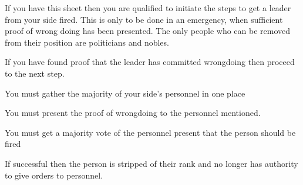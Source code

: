 \documentclass[green]{guildcamp3}
\begin{document}
	
	\name{\gYouAreFired{}}
		
	If you have this sheet then you are qualified to initiate the steps to get a leader from your side fired. This is only to be done in an emergency, when sufficient proof of wrong doing has been presented. The only people who can be removed from their position are politicians and nobles.	
	
	
	\begin{enum}[Directions]
		\item If you have found proof that the leader has committed wrongdoing then proceed to the next step.
		\item You must gather the majority of your side's personnel in one place
		\item You must present the proof of wrongdoing to the personnel mentioned.
		\item You must get a majority vote of the personnel present that the person should be fired
		\item If successful then the person is stripped of their rank and no longer has authority to give orders to personnel.
		
		
	\end{enum}
	
\end{document}
